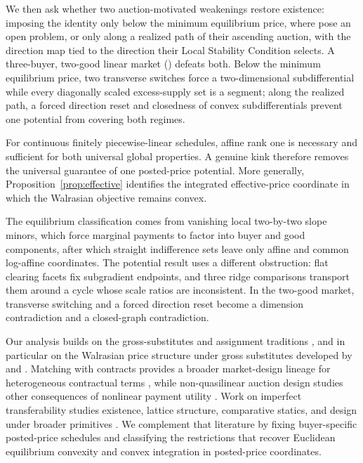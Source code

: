 We then ask whether two auction-motivated weakenings restore existence: imposing the identity only below the minimum equilibrium price, where \citet{okisato2026} pose an open problem, or only along a realized path of their ascending auction, with the direction map tied to the direction their Local Stability Condition selects. A three-buyer, two-good linear market () defeats both. Below the minimum equilibrium price, two transverse switches force a two-dimensional subdifferential while every diagonally scaled excess-supply set is a segment; along the realized path, a forced direction reset and closedness of convex subdifferentials prevent one potential from covering both regimes.

For continuous finitely piecewise-linear schedules, affine rank one is necessary and sufficient for both universal global properties. A genuine kink therefore removes the universal guarantee of one posted-price potential. More generally, Proposition~\ref{prop:effective} identifies the integrated effective-price coordinate in which the Walrasian objective remains convex.

The equilibrium classification comes from vanishing local two-by-two slope minors, which force marginal payments to factor into buyer and good components, after which straight indifference sets leave only affine and common log-affine coordinates. The potential result uses a different obstruction: flat clearing facets fix subgradient endpoints, and three ridge comparisons transport them around a cycle whose scale ratios are inconsistent. In the two-good market, transverse switching and a forced direction reset become a dimension contradiction and a closed-graph contradiction.

Our analysis builds on the gross-substitutes and assignment traditions \citep{shapleyshubik1971,kelsocrawford1982,bikhchandanimamer1997,danilovkoshevoymurota2001,murota2003,baldwinklemperer2019}, and in particular on the Walrasian price structure under gross substitutes developed by \citet{gulstacchetti1999} and \citet{milgromstrulovici2009}. Matching with contracts provides a broader market-design lineage for heterogeneous contractual terms \citep{hatfieldmilgrom2005}, while non-quasilinear auction design studies other consequences of nonlinear payment utility \citep{baisa2017}. Work on imperfect transferability studies existence, lattice structure, comparative statics, and design under broader primitives \citep{demangegale1985,alkan1989,alkan1992,galichonkominersweber2019,baldwinjagadeesanklempererteytelboym2023,fleineretal2019,schlegel2022,galichonweber2024}. We complement that literature by fixing buyer-specific posted-price schedules and classifying the restrictions that recover Euclidean equilibrium convexity and convex integration in posted-price coordinates.

